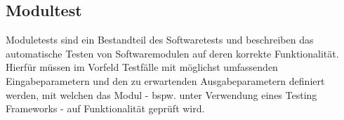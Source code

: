 \subsection{Modultest}
Moduletests sind ein Bestandteil des Softwaretests \cite{swtestwiki} und beschreiben das automatische Testen von Softwaremodulen auf deren korrekte Funktionalität. Hierfür müssen im Vorfeld Testfälle mit möglichst umfassenden Eingabeparametern und den zu erwartenden Ausgabeparametern definiert werden, mit welchen das Modul - bspw. unter Verwendung eines Testing Frameworks - auf Funktionalität geprüft wird. \cite{modultestwiki}
